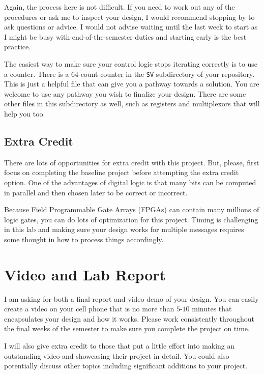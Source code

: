 \documentclass{article}
\begin{document}
Again, the process here is not difficult.  If you need to work out any
of the procedures or ask me to inspect your design, I would recommend
stopping by to ask questions or advice.  I would not advise waiting
until the last week to start as I might be busy with
end-of-the-semester duties and starting early is the best practice.

The easiest way to make sure your control logic stops iterating
correctly is to use a counter.  There is a $64$-count counter in the
\verb!SV! subdirectory of your repository.  This is just a helpful
file that can give you a pathway towards a solution.  You are welcome
to use any pathway you wish to finalize your design.  There are some
other files in this subdirectory as well, such as registers and
multiplexors that will help you too. 

\subsection{Extra Credit}

There are lots of opportunities for extra credit with this project.
But, please, first focus on completing the baseline project before
attempting the extra credit option.  One of the advantages of digital
logic is that many bits can be computed in parallel and then chosen
later to be correct or incorrect.

Because Field Programmable Gate Arrays
(FPGAs) can contain many millions of logic gates, you can do lots of
optimization for this project.  Timing is challenging in this lab and
making sure your design works for multiple messages requires some
thought in how to process things accordingly.

\section{Video and Lab Report}

I am asking for
both a final report and video demo of your design.  You can easily
create a video on your cell phone that is no more than $5$-$10$ minutes
that encapsulates your design and how it works.  Please work
consistently throughout the final weeks of the semester to make sure
you complete the project on time.

I will also give extra credit to those that put a little effort into
making an outstanding video and showcasing their project in detail.
You could also potentially discuss other topics including significant
additions to your project.
\end{document}
